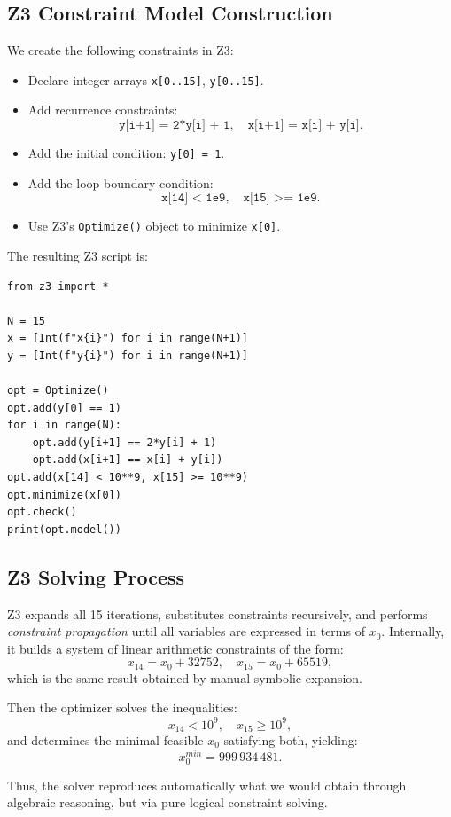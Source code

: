 \documentclass{article}
\begin{document}
\subsection*{Z3 Constraint Model Construction}

We create the following constraints in Z3:
\begin{itemize}
  \item Declare integer arrays \texttt{x[0..15]}, \texttt{y[0..15]}.
  \item Add recurrence constraints:
  \[
  \texttt{y[i+1] = 2*y[i] + 1}, \quad
  \texttt{x[i+1] = x[i] + y[i]}.
  \]
  \item Add the initial condition: \texttt{y[0] = 1}.
  \item Add the loop boundary condition:
  \[
  \texttt{x[14] < 1e9}, \quad \texttt{x[15] >= 1e9}.
  \]
  \item Use Z3's \texttt{Optimize()} object to minimize \texttt{x[0]}.
\end{itemize}

The resulting Z3 script is:

\begin{verbatim}
from z3 import *

N = 15
x = [Int(f"x{i}") for i in range(N+1)]
y = [Int(f"y{i}") for i in range(N+1)]

opt = Optimize()
opt.add(y[0] == 1)
for i in range(N):
    opt.add(y[i+1] == 2*y[i] + 1)
    opt.add(x[i+1] == x[i] + y[i])
opt.add(x[14] < 10**9, x[15] >= 10**9)
opt.minimize(x[0])
opt.check()
print(opt.model())
\end{verbatim}

\subsection*{Z3 Solving Process}

Z3 expands all 15 iterations, substitutes constraints recursively, and performs
\emph{constraint propagation} until all variables are expressed in terms of \(x_0\).
Internally, it builds a system of linear arithmetic constraints of the form:
\[
x_{14} = x_0 + 32752,\quad x_{15} = x_0 + 65519,
\]
which is the same result obtained by manual symbolic expansion.

Then the optimizer solves the inequalities:
\[
x_{14} < 10^9, \quad x_{15} \ge 10^9,
\]
and determines the minimal feasible \(x_0\) satisfying both, yielding:
\[
\boxed{x_0^{min} = 999\,934\,481.}
\]

Thus, the solver reproduces automatically what we would obtain
through algebraic reasoning, but via pure logical constraint solving.
\end{document}
